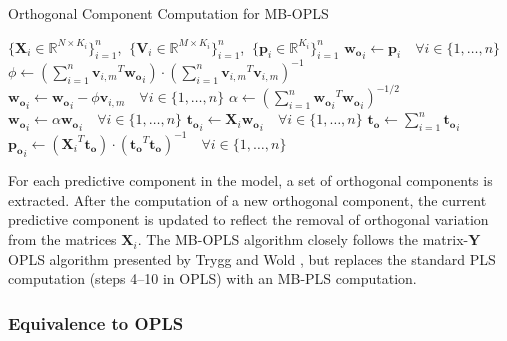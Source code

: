 \begin{algorithm}[H]
\caption{Orthogonal Component Computation for MB-OPLS}
\label{algorithm.9.4}
\begin{algorithmic}[1]
\REQUIRE $\{\mathbf{X}_i \in \mathbb{R}^{N \times K_i}\}_{i=1}^n$,%
       $\:\{\mathbf{V}_i \in \mathbb{R}^{M \times K_i}\}_{i=1}^n$,%
       $\:\{\mathbf{p}_i \in \mathbb{R}^{K_i}\}_{i=1}^n$
\STATE $\mathbf{w_o}_i \gets \mathbf{p}_i
        \quad \forall i \in \{1, \dots, n\}$
  \STATE $\phi \gets
      \left( \sum_{i=1}^n {\mathbf{v}_{i,m}}^T \mathbf{w_o}_i \right) \cdot
      \left( \sum_{i=1}^n {\mathbf{v}_{i,m}}^T \mathbf{v}_{i,m} \right)^{-1}$
  \STATE $\mathbf{w_o}_i \gets \mathbf{w_o}_i - \phi \mathbf{v}_{i,m}
          \quad \forall i \in \{1, \dots, n\}$
\ENDFOR
\STATE $\alpha \gets \left(
         \sum_{i=1}^n {\mathbf{w_o}_i}^T \mathbf{w_o}_i
        \right)^{-1/2}$
\STATE $\mathbf{w_o}_i \gets \alpha \mathbf{w_o}_i
        \quad \forall i \in \{1, \dots, n\}$
\STATE $\mathbf{t_o}_i \gets \mathbf{X}_i \mathbf{w_o}_i
        \quad \forall i \in \{1, \dots, n\}$
\STATE $\mathbf{t_o} \gets \sum_{i=1}^n \mathbf{t_o}_i$
\STATE $\mathbf{p_o}_i \gets
        \left( {\mathbf{X}_i}^T \mathbf{t_o} \right) \cdot
        \left( \mathbf{t_o}^T \mathbf{t_o} \right)^{-1}
        \quad \forall i \in \{1, \dots, n\}$
\end{algorithmic}
\end{algorithm}

\begin{doublespace}
For each predictive component in the model, a set of orthogonal components is
extracted. After the computation of a new orthogonal component, the current
predictive component is updated to reflect the removal of orthogonal variation
from the matrices $\mathbf{X}_i$. The MB-OPLS algorithm closely follows the
matrix-$\mathbf{Y}$ OPLS algorithm presented by Trygg and Wold
\cite{trygg:jchemo2002}, but replaces the standard PLS computation
(steps 4--10 in OPLS) with an MB-PLS computation.
\end{doublespace}

\subsubsection{Equivalence to OPLS}

